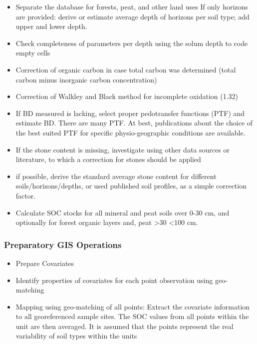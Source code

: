 \documentclass[10pt,b5paper,]{book}
\providecommand{\tightlist}{%
  \setlength{\itemsep}{0pt}\setlength{\parskip}{0pt}}
\theoremstyle{definition}
\theoremstyle{definition}
\theoremstyle{definition}
\theoremstyle{remark}
\begin{document}
\begin{itemize}
\tightlist
\item
  Separate the database for forests, peat, and other land uses If only
  horizons are provided: derive or estimate average depth of horizons
  per soil type; add upper and lower depth.
\item
  Check completeness of parameters per depth using the solum depth to
  code empty cells
\item
  Correction of organic carbon in case total carbon was determined
  (total carbon minus inorganic carbon concentration)
\item
  Correction of Walkley and Black method for incomplete oxidation (1.32)
\item
  If BD measured is lacking, select proper pedotransfer functions (PTF)
  and estimate BD. There are many PTF. At best, publications about the
  choice of the best suited PTF for specific physio-geographic
  conditions are available.
\item
  If the stone content is missing, investigate using other data sources
  or literature, to which a correction for stones should be applied
\item
  if possible, derive the standard average stone content for different
  soils/horizons/depths, or used published soil profiles, as a simple
  correction factor.
\item
  Calculate SOC stocks for all mineral and peat soils over 0-30 cm, and
  optionally for forest organic layers and, peat \textgreater{}30
  \textless{}100 cm.
\end{itemize}

\hypertarget{preparatory-gis-operations}{%
\subsubsection{Preparatory GIS
Operations}\label{preparatory-gis-operations}}

\begin{itemize}
\tightlist
\item
  Prepare Covariates
\item
  Identify properties of covariates for each point observation using
  geo-matching
\item
  Mapping using geo-matching of all points: Extract the covariate
  information to all georeferenced sample sites. The SOC values from all
  points within the unit are then averaged. It is assumed that the
  points represent the real variability of soil types within the units
\end{itemize}
\end{document}
